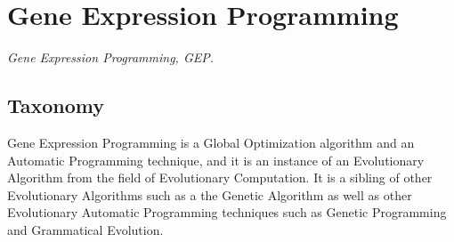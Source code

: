 

\section{Gene Expression Programming} 
\label{sec:gene_expression_programming}

\emph{Gene Expression Programming, GEP.}

\subsection{Taxonomy}
Gene Expression Programming is a Global Optimization algorithm and an Automatic Programming technique, and it is an instance of an Evolutionary Algorithm from the field of Evolutionary Computation.
It is a sibling of other Evolutionary Algorithms such as a the Genetic Algorithm as well as other Evolutionary Automatic Programming techniques such as Genetic Programming and Grammatical Evolution.

